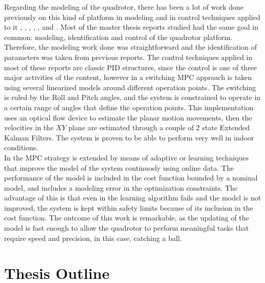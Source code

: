 Regarding the modeling of the quadrotor, there has been a lot of work done previously on this kind of platform in modeling and in control techniques applied to it \cite{Bouabdallah2004},  \cite{Bresciani2008}, \cite{Lellis}, \cite{Raffo2007}, \cite{Salih2010}, \cite{YueSun2012} and \cite{MahoneyKumarCorke2012}. Most of the master thesis reports studied had the same goal in common: modeling, identification and control of the quadrotor platform. Therefore, the modeling work done was straightforward and the identification of parameters was taken from previous reports. The control techniques applied in most of these reports are classic PID structures, since the control is one of three major activities of the content, however in \cite{Alexis2011} a switching MPC approach is taken using several linearized models around different operation points. The switching is ruled by the Roll and Pitch angles, and the system is constrained to operate in a certain range of angles that define the operation points. This implementation uses an optical flow device to estimate the planar motion movements, then the velocities in the $XY$ plane are estimated through a couple of 2 state Extended Kalman Filters. The system is proven to be able to perform very well in indoor conditions.\\

In \cite{Bouffard2012} the MPC strategy is extended by means of adaptive or learning techniques that improve the model of the system continuosly using online data. The performance of the model is included in the cost function bounded by a nominal model, and includes a modeling error in the optimization constraints. The advantage of this is that even in the learning algorithm fails and the model is not improved, the system is kept within safety limits because of its inclusion in the cost function. The outcome of this work is remarkable, as the updating of the model is fast enough to allow the quadrotor to perform meaningful tasks that require speed and precision, in this case, catching a ball.

\section{Thesis Outline}


